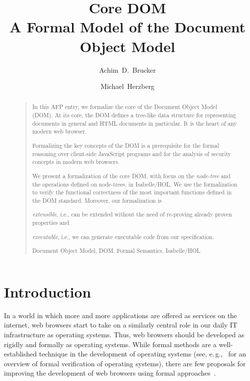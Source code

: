 \documentclass[10pt,DIV16,a4paper,abstract=true,twoside=semi,openright]
{scrreprt}
\title{Core DOM\\\medskip \Large 
  A Formal Model of the Document Object Model}%
\author{Achim~D.~Brucker \and Michael~Herzberg}%
\newcommand{\eg}{e.\,g.\xspace}
\begin{document}
  \maketitle
  \begin{abstract}
    \begin{quote}
    In this AFP entry, we formalize the core of the Document Object
    Model (DOM).  At its core, the DOM defines a tree-like data
    structure for representing documents in general and HTML documents
    in particular. It is the heart of any modern web browser.

    Formalizing the key concepts of the DOM is a prerequisite for the
    formal reasoning over client-side JavaScript programs and for the
    analysis of security concepts in modern web browsers.

    
    We present a formalization of the core DOM, with focus on the
    \emph{node-tree} and the operations defined on node-trees, in
    Isabelle/HOL\@. We use the formalization to verify the functional
    correctness of the most important functions defined in the DOM
    standard. Moreover, our formalization is
    \begin{inparaenum}
    \item \emph{extensible}, i.e., can be extended without the need of
      re-proving already proven properties and
    \item \emph{executable}, i.e., we can generate executable code
      from our specification.
    \end{inparaenum}

    \bigskip
      Document Object Model, DOM, Formal Semantics, Isabelle/HOL      
    \end{quote}
  \end{abstract}


\tableofcontents
\cleardoublepage

\chapter{Introduction}
In a world in which more and more applications are offered as services
on the internet, web browsers start to take on a similarly central
role in our daily IT infrastructure as operating systems. Thus, web
browsers should be developed as rigidly and formally as operating
systems. While formal methods are a well-established technique in the
development of operating systems (see,
\eg,~\citet{klein:operating:2009} for an overview of formal
verification of operating systems), there are few proposals for
improving the development of web browsers using formal
approaches~\cite{gardner.ea:dom:2008,raad.ea:dom:2016,jang.ea:establishing:2012,bohannon.ea:featherweight:2010}.
\end{document}
